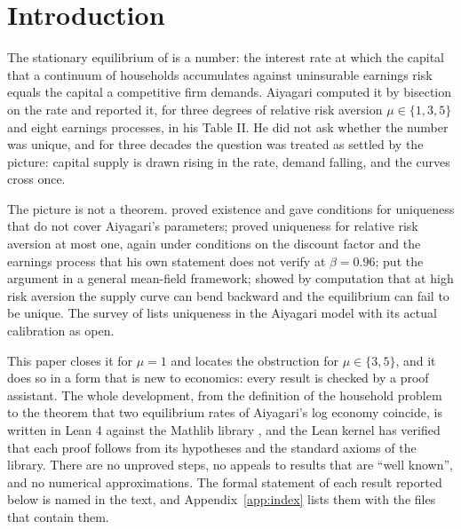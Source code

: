 \section{Introduction}

The stationary equilibrium of \citet{Aiyagari1994} is a number: the interest rate at which the
capital that a continuum of households accumulates against uninsurable earnings risk equals the
capital a competitive firm demands. Aiyagari computed it by bisection on the rate and reported it,
for three degrees of relative risk aversion $\mu\in\{1,3,5\}$ and eight earnings processes, in his
Table II. He did not ask whether the number was unique, and for three decades the question was
treated as settled by the picture: capital supply is drawn rising in the rate, demand falling, and
the curves cross once.

The picture is not a theorem. \citet{Acikgoz2018} proved existence and gave conditions for
uniqueness that do not cover Aiyagari's parameters; \citet{Light2020} proved uniqueness for
relative risk aversion at most one, again under conditions on the discount factor and the earnings
process that his own statement does not verify at $\beta=0.96$; \citet{Light2022} put the argument
in a general mean-field framework; \citet{YoungWalsh2025} showed by computation that at high risk
aversion the supply curve can bend backward and the equilibrium can fail to be unique. The survey
of \citet{TodaWalsh2024} lists uniqueness in the Aiyagari model with its actual calibration as
open.

This paper closes it for $\mu=1$ and locates the obstruction for $\mu\in\{3,5\}$, and it does so in
a form that is new to economics: every result is checked by a proof assistant. The whole
development, from the definition of the household problem to the theorem that two equilibrium rates
of Aiyagari's log economy coincide, is written in Lean 4 \citep{Lean4} against the Mathlib library
\citep{Mathlib}, and the Lean kernel has verified that each proof follows from its hypotheses and
the standard axioms of the library. There are no unproved steps, no appeals to results that are
``well known'', and no numerical approximations. The formal statement of each result reported below
is named in the text, and Appendix~\ref{app:index} lists them with the files that contain them.

